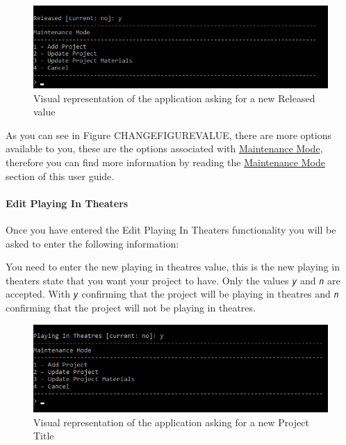 \documentclass[
  english,
  a4paper,
,tablecaptionabove
]{scrartcl}
\begin{document}
\begin{figure}
\centering
\includegraphics{images/user-guide/maintenance-mode/update-project-released.png}
\caption{Visual representation of the application asking for a new
Released value}
\end{figure}

As you can see in Figure CHANGEFIGUREVALUE, there are more options
available to you, these are the options associated with
\protect\hyperlink{using-maintenance-mode}{Maintenance Mode}, therefore
you can find more information by reading the
\protect\hyperlink{using-maintenance-mode}{Maintenance Mode} section of
this user guide.

\newpage

\hypertarget{edit-playing-in-theaters}{%
\paragraph{Edit Playing In Theaters}\label{edit-playing-in-theaters}}

Once you have entered the Edit Playing In Theaters functionality you
will be asked to enter the following information:

You need to enter the new playing in theatres value, this is the new
playing in theaters state that you want your project to have. Only the
values \emph{\texttt{y}} and \emph{\texttt{n}} are accepted. With
\emph{\texttt{y}} confirming that the project will be playing in
theatres and \emph{\texttt{n}} confirming that the project will not be
playing in theatres.

\begin{figure}
\centering
\includegraphics{images/user-guide/maintenance-mode/update-project-playing-in-theaters.png}
\caption{Visual representation of the application asking for a new
Project Title}
\end{figure}
\end{document}
